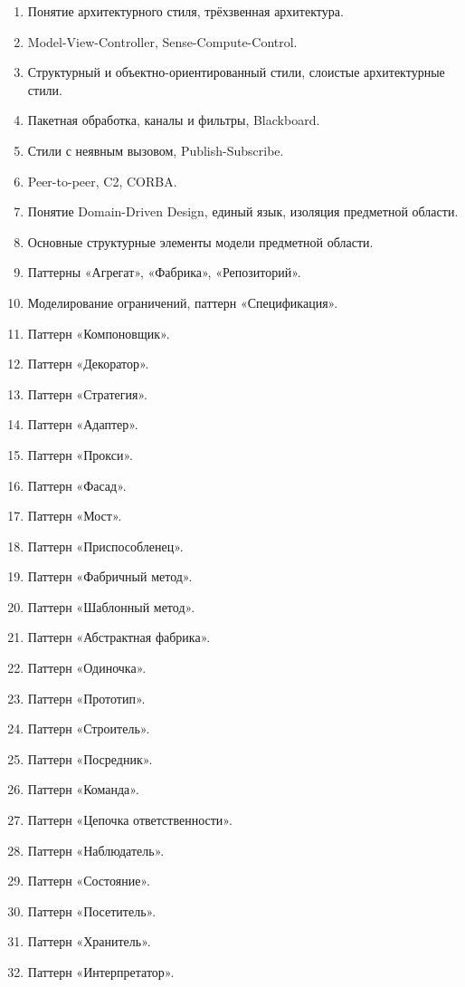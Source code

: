 \documentclass[a5paper]{article}
\begin{document}
\begin{enumerate}
    \item Понятие архитектурного стиля, трёхзвенная архитектура.
    \item Model-View-Controller, Sense-Compute-Control.
    \item Структурный и объектно-ориентированный стили, слоистые архитектурные стили.
    \item Пакетная обработка, каналы и фильтры, Blackboard.
    \item Стили с неявным вызовом, Publish-Subscribe.
    \item Peer-to-peer, C2, CORBA.
    \item Понятие Domain-Driven Design, единый язык, изоляция предметной области.
    \item Основные структурные элементы модели предметной области.
    \item Паттерны «Агрегат», «Фабрика», «Репозиторий».
    \item Моделирование ограничений, паттерн «Спецификация».
    \item Паттерн «Компоновщик».
    \item Паттерн «Декоратор».
    \item Паттерн «Стратегия».
    \item Паттерн «Адаптер».
    \item Паттерн «Прокси».
    \item Паттерн «Фасад».
    \item Паттерн «Мост».
    \item Паттерн «Приспособленец».
    \item Паттерн «Фабричный метод».
    \item Паттерн «Шаблонный метод».
    \item Паттерн «Абстрактная фабрика».
    \item Паттерн «Одиночка».
    \item Паттерн «Прототип».
    \item Паттерн «Строитель».
    \item Паттерн «Посредник».
    \item Паттерн «Команда».
    \item Паттерн «Цепочка ответственности».
    \item Паттерн «Наблюдатель».
    \item Паттерн «Состояние».
    \item Паттерн «Посетитель».
    \item Паттерн «Хранитель».
    \item Паттерн «Интерпретатор».

\end{enumerate}
\end{document}
